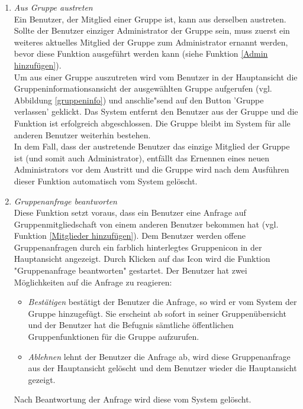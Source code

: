 \documentclass[parskip=full]{scrartcl}
\def\threedigits#1{%
  \ifnum#1<100 0\fi
  \ifnum#1<10 0\fi
  \number#1}
\begin{document}
\begin{enumerate}[label={\textbf{/F\protect\threedigits{\theenumi}0/}}, leftmargin=*, resume]
	
	\item \textit{Aus Gruppe austreten}\label{aus Gruppe austreten}\\
	Ein \gls{Benutzer}, der Mitglied einer Gruppe ist, kann aus derselben austreten. Sollte der Benutzer einziger Administrator der Gruppe sein, muss zuerst ein weiteres aktuelles Mitglied der Gruppe zum Administrator ernannt werden, bevor diese Funktion ausgeführt werden kann (siehe Funktion \ref{Admin hinzufügen}). \\
	Um aus einer Gruppe auszutreten wird vom Benutzer in der Hauptansicht die Gruppeninformationsansicht der ausgewählten Gruppe aufgerufen (vgl. Abbildung \ref{gruppeninfo}) und anschlie"send auf den Button 'Gruppe verlassen' geklickt. Das System entfernt den Benutzer aus der Gruppe und die Funktion ist erfolgreich abgeschlossen. Die Gruppe bleibt im System für alle anderen Benutzer weiterhin bestehen.\\
	In dem Fall, dass der austretende Benutzer das einzige Mitglied der Gruppe ist (und somit auch Administrator), entfällt das Ernennen eines neuen Administrators vor dem Austritt und die Gruppe wird nach dem Ausführen dieser Funktion automatisch vom System gelöscht.
	
	\item \textit{Gruppenanfrage beantworten}\label{Gruppenanfrage beantworten} \\
	Diese Funktion setzt voraus, dass ein Benutzer eine Anfrage auf Gruppenmitgliedschaft von einem anderen Benutzer bekommen hat (vgl. Funktion \ref{Mitglieder hinzufügen}). Dem Benutzer werden offene Gruppenanfragen durch ein farblich hinterlegtes Gruppenicon in der Hauptansicht angezeigt. Durch Klicken auf das Icon wird die Funktion "Gruppenanfrage beantworten" gestartet. Der Benutzer hat zwei Möglichkeiten auf die Anfrage zu reagieren:
	\begin{itemize}
		\item \textit{Bestätigen} bestätigt der Benutzer die Anfrage, so wird er vom System der Gruppe hinzugefügt. Sie erscheint ab sofort in seiner Gruppenübersicht und der Benutzer hat die Befugnis sämtliche öffentlichen Gruppenfunktionen für die Gruppe aufzurufen.
		\item \textit{Ablehnen} lehnt der Benutzer die Anfrage ab, wird diese Gruppenanfrage aus der Hauptansicht gelöscht und dem Benutzer wieder die Hauptansicht gezeigt.
	\end{itemize}
Nach Beantwortung der Anfrage wird diese vom System gelöscht.
\end{enumerate}
\end{document}
